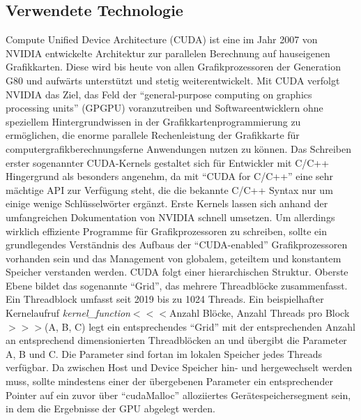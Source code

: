 \documentclass[12pt, onecolumn, notitlepage]{scrartcl}
\begin{document}
\subsection{Verwendete Technologie}
Compute Unified Device Architecture (CUDA) ist eine im Jahr 2007 von NVIDIA entwickelte Architektur zur parallelen
Berechnung auf hauseigenen Grafikkarten. Diese wird bis heute von allen Grafikprozessoren der Generation G80 und aufwärts unterstützt 
und stetig weiterentwickelt. Mit CUDA verfolgt NVIDIA das Ziel, das Feld der \enquote{general-purpose computing on graphics processing units} (GPGPU) 
voranzutreiben und Softwareentwicklern ohne speziellem Hintergrundwissen in der Grafikkartenprogrammierung zu ermöglichen, die enorme parallele Rechenleistung 
der Grafikkarte für computergrafikberechnungsferne Anwendungen nutzen zu können. \newline
Das Schreiben erster sogenannter CUDA-Kernels gestaltet sich 
für Entwickler mit C/C++ Hingergrund als besonders angenehm, da mit \enquote{CUDA for C/C++} eine sehr mächtige API zur Verfügung steht, die
die bekannte C/C++ Syntax nur um einige wenige Schlüsselwörter ergänzt. \newline 
Erste Kernels lassen sich anhand der umfangreichen Dokumentation von NVIDIA 
schnell umsetzen. Um allerdings wirklich effiziente Programme für Grafikprozessoren zu schreiben, sollte ein grundlegendes Verständnis des Aufbaus der 
\enquote{CUDA-enabled} Grafikprozessoren vorhanden sein und das Management von globalem, geteiltem und konstantem Speicher verstanden werden.\newline
CUDA folgt einer hierarchischen Struktur. Oberste Ebene bildet das sogenannte \enquote{Grid}, das mehrere Threadblöcke zusammenfasst. Ein Threadblock umfasst seit 2019 bis zu 1024 Threads.
Ein beispielhafter Kernelaufruf \newline
\newline
\textit{kernel\_function}$<<<$Anzahl Blöcke, Anzahl Threads pro Block$>>>$(A, B, C) \newline
\newline
legt ein entsprechendes 
\enquote{Grid} mit der entsprechenden Anzahl an entsprechend dimensionierten Threadblöcken an und übergibt die Parameter A, B und C. Die Parameter sind fortan im lokalen Speicher jedes Threads verfügbar.
Da zwischen Host und Device Speicher hin- und hergewechselt werden muss, sollte mindestens einer der übergebenen Parameter ein entsprechender Pointer auf ein zuvor über \enquote{cudaMalloc} alloziiertes Gerätespeichersegment sein, in dem die Ergebnisse der GPU abgelegt werden. 
\end{document}
